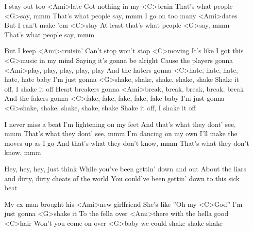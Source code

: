 
\zs
I stay out too <Ami>late
Got nothing in my <C>brain
That's what people <G>say, mmm
That's what people say, mmm
I go on too many <Ami>dates
But I can't make 'em <C>stay
At least that's what people <G>say, mmm
That's what people say, mmm
\ks

\zr
But I keep <Ami>cruisin'
Can't stop won't stop <C>moving
It's like I got this <G>music in my mind
Saying it's gonna be alright
Cause the players gonna <Ami>play, play, play, play, play
And the haters gonna <C>hate, hate, hate, hate, hate baby
I'm just gonna <G>shake, shake, shake, shake, shake
Shake it off, I shake it off
Heart breakers gonna <Ami>break, break, break, break, break
And the fakers gonna <C>fake, fake, fake, fake, fake baby
I'm just gonna <G>shake, shake, shake, shake, shake
Shake it off, I shake it off
\kr

\zs
I never miss a beat
I'm lightening on my feet
And that's what they dont' see, mmm
That's what they dont' see, mmm
I'm dancing on my own
I'll make the moves up as I go
And that's what they don't know, mmm
That's what they don't know, mmm
\ks

\zr\kr

\zs
Hey, hey, hey, just think
While you've been gettin' down and out
About the liars and dirty, dirty cheats of the world
You could've been gettin' down to this sick beat
\ks

\zs
My ex man brought his <Ami>new girlfriend
She's like ''Oh my <C>God''
I'm just gonna <G>shake it
To the fella over <Ami>there with the hella good <C>hair
Won't you come on over <G>baby we could shake shake shake
\ks

\zr\kr

\kp
